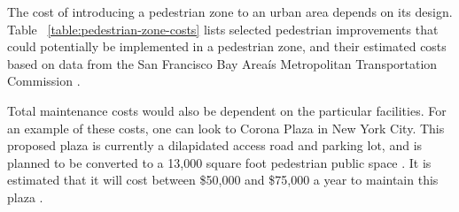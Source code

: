 The cost of introducing a pedestrian zone to an urban area depends on its design. Table ~\ref{table:pedestrian-zone-costs} lists selected pedestrian improvements that could potentially be implemented in a pedestrian zone, and their estimated costs based on data from the San Francisco Bay Areaís Metropolitan Transportation Commission \cite{PZ8}.


 
Total maintenance costs would also be dependent on the particular facilities. For an example of these costs, one can look to Corona Plaza in New York City. This proposed plaza is currently a dilapidated access road and parking lot, and is planned to be converted to a 13,000 square foot pedestrian public space \cite{PZ10}. It is estimated that it will cost between \$50,000 and \$75,000 a year to maintain this plaza \cite{PZ11}.
